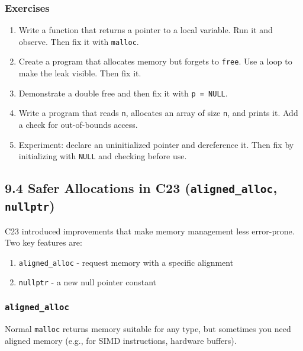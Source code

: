 \documentclass[
  letterpaper,
  DIV=11,
  numbers=noendperiod]{scrreprt}
\providecommand{\tightlist}{%
  \setlength{\itemsep}{0pt}\setlength{\parskip}{0pt}}
\begin{document}
\subsubsection{Exercises}\label{exercises-42}

\begin{enumerate}
\def\labelenumi{\arabic{enumi}.}
\tightlist
\item
  Write a function that returns a pointer to a local variable. Run it
  and observe. Then fix it with \texttt{malloc}.
\item
  Create a program that allocates memory but forgets to \texttt{free}.
  Use a loop to make the leak visible. Then fix it.
\item
  Demonstrate a double free and then fix it with \texttt{p\ =\ NULL}.
\item
  Write a program that reads \texttt{n}, allocates an array of size
  \texttt{n}, and prints it. Add a check for out-of-bounds access.
\item
  Experiment: declare an uninitialized pointer and dereference it. Then
  fix by initializing with \texttt{NULL} and checking before use.
\end{enumerate}

\subsection{\texorpdfstring{9.4 Safer Allocations in C23
(\texttt{aligned\_alloc},
\texttt{nullptr})}{9.4 Safer Allocations in C23 (aligned\_alloc, nullptr)}}\label{safer-allocations-in-c23-aligned_alloc-nullptr}

C23 introduced improvements that make memory management less
error-prone. Two key features are:

\begin{enumerate}
\def\labelenumi{\arabic{enumi}.}
\tightlist
\item
  \texttt{aligned\_alloc} - request memory with a specific alignment
\item
  \texttt{nullptr} - a new null pointer constant
\end{enumerate}

\subsubsection{\texorpdfstring{\texttt{aligned\_alloc}}{aligned\_alloc}}\label{aligned_alloc}

Normal \texttt{malloc} returns memory suitable for any type, but
sometimes you need aligned memory (e.g., for SIMD instructions, hardware
buffers).
\end{document}
